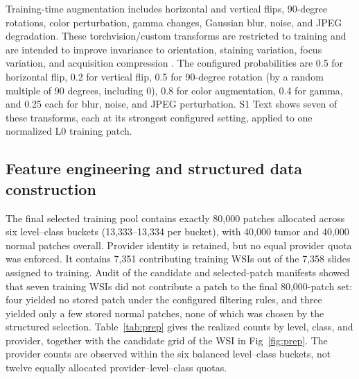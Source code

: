 \documentclass[10pt,letterpaper]{article}
\begin{document}
Training-time augmentation includes horizontal and vertical flips, 90-degree rotations, color perturbation, gamma changes, Gaussian blur, noise, and JPEG degradation. These torchvision/custom transforms are restricted to training and are intended to improve invariance to orientation, staining variation, focus variation, and acquisition compression \cite{bib24}. The configured probabilities are 0.5 for horizontal flip, 0.2 for vertical flip, 0.5 for 90-degree rotation (by a random multiple of 90 degrees, including 0), 0.8 for color augmentation, 0.4 for gamma, and 0.25 each for blur, noise, and JPEG perturbation. S1 Text shows seven of these transforms, each at its strongest configured setting, applied to one normalized L0 training patch.

\subsection*{Feature engineering and structured data construction}
The final selected training pool contains exactly 80,000 patches allocated across six level--class buckets (13,333--13,334 per bucket), with 40,000 tumor and 40,000 normal patches overall. Provider identity is retained, but no equal provider quota was enforced. It contains 7,351 contributing training WSIs out of the 7,358 slides assigned to training. Audit of the candidate and selected-patch manifests showed that seven training WSIs did not contribute a patch to the final 80,000-patch set: four yielded no stored patch under the configured filtering rules, and three yielded only a few stored normal patches, none of which was chosen by the structured selection. Table~\ref{tab:prep} gives the realized counts by level, class, and provider, together with the candidate grid of the WSI in Fig~\ref{fig:prep}. The provider counts are observed within the six balanced level--class buckets, not twelve equally allocated provider--level--class quotas.
\end{document}
